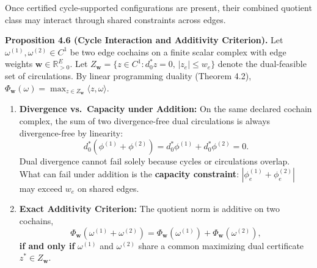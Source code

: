 \documentclass[
]{article}
\providecommand{\tightlist}{%
  \setlength{\itemsep}{0pt}\setlength{\parskip}{0pt}}
\providecommand{\tightlist}{%
  \setlength{\itemsep}{0pt}\setlength{\parskip}{0pt}}
\begin{document}
Once certified cycle-supported configurations are present, their combined quotient class may interact through shared constraints across edges.

\textbf{Proposition 4.6 (Cycle Interaction and Additivity Criterion).} Let \(\omega^{(1)}, \omega^{(2)} \in C^1\) be two edge cochains on a finite scalar complex with edge weights \(\mathbf{w} \in \mathbb{R}_{>0}^E\). Let \(Z_{\mathbf{w}} = \{z \in C^1 : d_0^* z = 0, \, |z_e| \le w_e\}\) denote the dual-feasible set of circulations.
By linear programming duality (Theorem 4.2), \(\Phi_{\mathbf{w}}(\omega) = \max_{z \in Z_{\mathbf{w}}} \langle z, \omega \rangle\).

\begin{enumerate}
\def\labelenumi{\arabic{enumi}.}
\tightlist
\item
  \textbf{Divergence vs.~Capacity under Addition:} On the same declared cochain complex, the sum of two divergence-free dual circulations is always divergence-free by linearity:
  \[d_0^*(\phi^{(1)} + \phi^{(2)}) = d_0^*\phi^{(1)} + d_0^*\phi^{(2)} = 0.\]
  Dual divergence cannot fail solely because cycles or circulations overlap. What can fail under addition is the \textbf{capacity constraint}: \(|\phi^{(1)}_e + \phi^{(2)}_e|\) may exceed \(w_e\) on shared edges.
\item
  \textbf{Exact Additivity Criterion:} The quotient norm is additive on two cochains,
  \[\Phi_{\mathbf{w}}(\omega^{(1)} + \omega^{(2)}) = \Phi_{\mathbf{w}}(\omega^{(1)}) + \Phi_{\mathbf{w}}(\omega^{(2)}),\]
  \textbf{if and only if} \(\omega^{(1)}\) and \(\omega^{(2)}\) share a common maximizing dual certificate \(z^* \in Z_{\mathbf{w}}\).
\end{enumerate}
\end{document}
